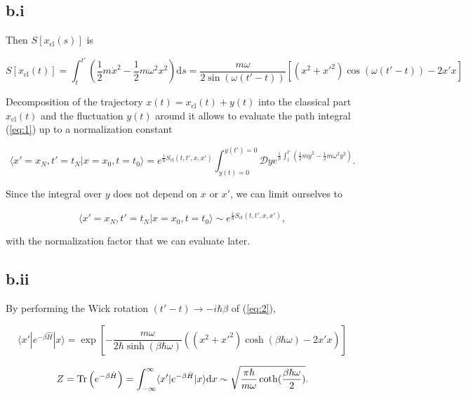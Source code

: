 \subsection*{b.i}

Then $S[x_{\mathrm{cl}}(s)]$ is

\begin{equation}
    S[x_{\mathrm{cl}}(t)] = \int_{t}^{t'}\left(\frac{1}{2}m\dot{x}^2-\frac{1}{2}m\omega^2x^2\right)\mathrm{d}s = \frac{m\omega}{2\sin(\omega(t'-t))}\left[(x^2+x'^2)\cos(\omega(t'-t))-2x'x\right]
\end{equation}

Decomposition of the trajectory $x(t) = x_{\mathrm{cl}}(t)+y(t)$ into the classical part $x_{\mathrm{cl}}(t)$ and the fluctuation $y(t)$ around it allows to evaluate the path integral (\ref{eq:1}) up to a normalization constant

\begin{equation}
    \langle x'=x_N,t'=t_N|x=x_0,t=t_0\rangle = e^{\frac{i}{\hbar}S_{\mathrm{cl}}(t,t',x,x')}\int_{y(t)=0}^{y(t')=0}\mathcal{D}y e^{\frac{i}{\hbar}\int_t^{t'}\left(\frac{1}{2}m\dot{y}^2-\frac{1}{2}m\omega^2y^2\right)}.
\end{equation}

Since the integral over $y$ does not depend on $x$ or $x'$, we can limit ourselves to

\begin{equation}
    \langle x'=x_N,t'=t_N|x=x_0,t=t_0\rangle \sim e^{\frac{i}{\hbar}S_{\mathrm{cl}}(t,t',x,x')} \label{eq:2},
\end{equation}

with the normalization factor that we can evaluate later.

\subsection*{b.ii}

By performing the Wick rotation $(t'-t)\rightarrow -i\hbar\beta$ of (\ref{eq:2}),

\begin{equation}
    \langle x'|e^{-\beta\hat{H}}|x\rangle = \exp\left[-\frac{m\omega}{2\hbar\sinh(\beta\hbar\omega)}\left((x^2+x'^2)\cosh(\beta\hbar\omega)-2x'x\right)\right]
\end{equation}

\begin{equation}
    Z = \operatorname{Tr}\left(e^{-\beta\hat{H}}\right) = \int_{-\infty}^{\infty}\langle x'|e^{-\beta\hat{H}}|x\rangle\mathrm{d}x \sim \sqrt{\frac{\pi\hbar}{m\omega}\coth(\frac{\beta\hbar\omega}{2})}.
\end{equation}

